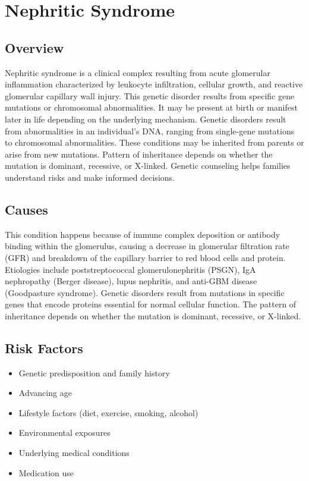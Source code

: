 \chapter{Nephritic Syndrome}
\label{sec:Nephritic Syndrome}

\section{Overview}
Nephritic syndrome is a clinical complex resulting from acute glomerular inflammation characterized by leukocyte infiltration, cellular growth, and reactive glomerular capillary wall injury. This genetic disorder results from specific gene mutations or chromosomal abnormalities. It may be present at birth or manifest later in life depending on the underlying mechanism. Genetic disorders result from abnormalities in an individual's DNA, ranging from single-gene mutations to chromosomal abnormalities. These conditions may be inherited from parents or arise from new mutations. Pattern of inheritance depends on whether the mutation is dominant, recessive, or X-linked. Genetic counseling helps families understand risks and make informed decisions.
\section{Causes}
This condition happens because of immune complex deposition or antibody binding within the glomerulus, causing a decrease in glomerular filtration rate (GFR) and breakdown of the capillary barrier to red blood cells and protein. Etiologies include poststreptococcal glomerulonephritis (PSGN), IgA nephropathy (Berger disease), lupus nephritis, and anti-GBM disease (Goodpasture syndrome). Genetic disorders result from mutations in specific genes that encode proteins essential for normal cellular function. The pattern of inheritance depends on whether the mutation is dominant, recessive, or X-linked.   
\section{Risk Factors}

\begin{itemize}[noitemsep]
  \item Genetic predisposition and family history
  \item Advancing age
  \item Lifestyle factors (diet, exercise, smoking, alcohol)
  \item Environmental exposures
  \item Underlying medical conditions
  \item Medication use
\end{itemize}
